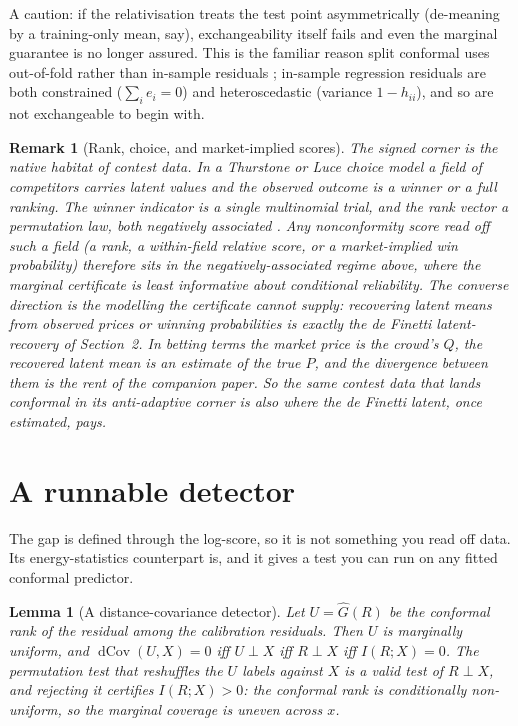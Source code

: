 \documentclass[11pt]{article}
\newtheorem{lemma}{Lemma}
\newtheorem{remark}{Remark}
\begin{document}
A caution: if the relativisation treats the test point asymmetrically (de-meaning by a
training-only mean, say), exchangeability itself fails and even the marginal guarantee is no
longer assured. This is the familiar reason split conformal uses out-of-fold rather than
in-sample residuals \citep{lei2018}; in-sample regression residuals are both constrained
($\sum_i e_i=0$) and heteroscedastic (variance $1-h_{ii}$), and so are not exchangeable to
begin with.

\begin{remark}[Rank, choice, and market-implied scores]
The signed corner is the native habitat of contest data. In a Thurstone or Luce choice model a
field of competitors carries latent values and the observed outcome is a winner or a full
ranking. The winner indicator is a single multinomial trial, and the rank vector a
permutation law, both negatively associated \citep{joagdev1983}. Any nonconformity score
read off such a field (a rank, a within-field relative score, or a market-implied win
probability) therefore sits in the negatively-associated regime above, where the marginal
certificate is least informative about conditional reliability. The converse direction is the
modelling the certificate cannot supply: recovering latent means from observed prices or
winning probabilities \citep{cotton_horserace} is exactly the de Finetti latent-recovery of
Section~2. In betting terms the market price is the crowd's $Q$, the recovered latent mean is an
estimate of the true $P$, and the divergence between them is the rent of the companion paper.
So the same contest data that lands conformal in its anti-adaptive corner is also where the de
Finetti latent, once estimated, pays.
\end{remark}

\section{A runnable detector}

The gap is defined through the log-score, so it is not something you read off data. Its
energy-statistics counterpart is, and it gives a test you can run on any fitted conformal
predictor.

\begin{lemma}[A distance-covariance detector]\label{lem:dcov}
Let $U=\widehat G(R)$ be the conformal rank of the residual among the calibration residuals.
Then $U$ is marginally uniform, and $\operatorname{dCov}(U,X)=0$ iff $U\perp X$ iff $R\perp X$ iff
$I(R;X)=0$. The permutation test that reshuffles the $U$ labels against $X$ is a valid test of
$R\perp X$, and rejecting it certifies $I(R;X)>0$: the conformal rank is conditionally
non-uniform, so the marginal coverage is uneven across $x$.
\end{lemma}
\end{document}
